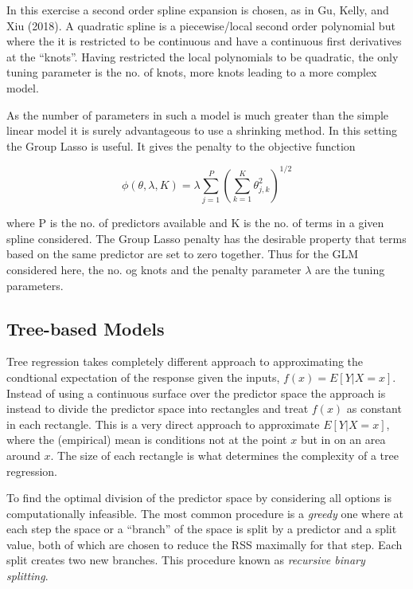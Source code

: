 \documentclass[]{article}
\begin{document}
In this exercise a second order spline expansion is chosen, as in Gu,
Kelly, and Xiu (2018). A quadratic spline is a piecewise/local second
order polynomial but where the it is restricted to be continuous and
have a continuous first derivatives at the ``knots''. Having restricted
the local polynomials to be quadratic, the only tuning parameter is the
no. of knots, more knots leading to a more complex model.

As the number of parameters in such a model is much greater than the
simple linear model it is surely advantageous to use a shrinking method.
In this setting the Group Lasso is useful. It gives the penalty to the
objective function

\[\phi(\theta, \lambda, K) = \lambda \sum_{j=1}^P \left(  \sum_{k=1}^K \theta_{j,k}^2   \right)^{1/2}\]

where P is the no. of predictors available and K is the no. of terms in
a given spline considered. The Group Lasso penalty has the desirable
property that terms based on the same predictor are set to zero
together. Thus for the GLM considered here, the no. og knots and the
penalty parameter \(\lambda\) are the tuning parameters.

\hypertarget{tree-based-models}{%
\subsection{Tree-based Models}\label{tree-based-models}}

Tree regression takes completely different approach to approximating the
condtional expectation of the response given the inputs,
\(f(x) = E[Y|X=x]\). Instead of using a continuous surface over the
predictor space the approach is instead to divide the predictor space
into rectangles and treat \(f(x)\) as constant in each rectangle. This
is a very direct approach to approximate \(E[Y|X=x]\), where the
(empirical) mean is conditions not at the point \(x\) but in on an area
around \(x\). The size of each rectangle is what determines the
complexity of a tree regression.

To find the optimal division of the predictor space by considering all
options is computationally infeasible. The most common procedure is a
\emph{greedy} one where at each step the space or a ``branch'' of the
space is split by a predictor and a split value, both of which are
chosen to reduce the RSS maximally for that step. Each split creates two
new branches. This procedure known as \emph{recursive binary splitting}.
\end{document}
